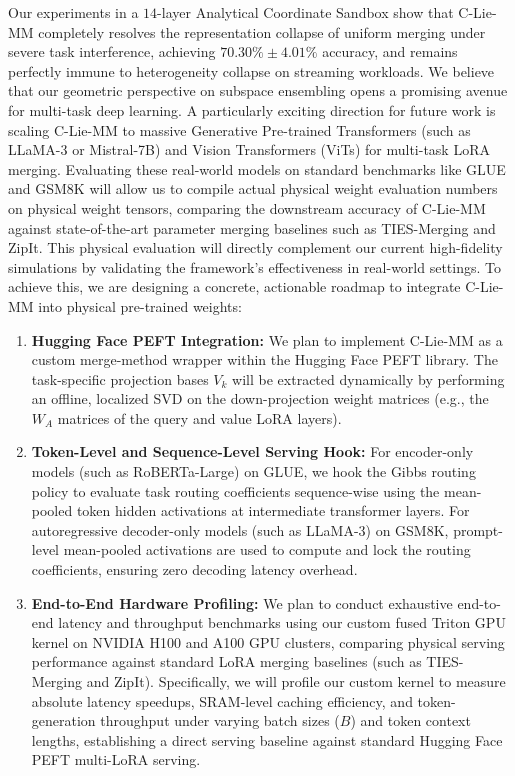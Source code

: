 Our experiments in a $14$-layer Analytical Coordinate Sandbox show that C-Lie-MM completely resolves the representation collapse of uniform merging under severe task interference, achieving $70.30\% \pm 4.01\%$ accuracy, and remains perfectly immune to heterogeneity collapse on streaming workloads. We believe that our geometric perspective on subspace ensembling opens a promising avenue for multi-task deep learning. A particularly exciting direction for future work is scaling C-Lie-MM to massive Generative Pre-trained Transformers (such as LLaMA-3 or Mistral-7B) and Vision Transformers (ViTs) for multi-task LoRA merging. Evaluating these real-world models on standard benchmarks like GLUE and GSM8K will allow us to compile actual physical weight evaluation numbers on physical weight tensors, comparing the downstream accuracy of C-Lie-MM against state-of-the-art parameter merging baselines such as TIES-Merging and ZipIt. This physical evaluation will directly complement our current high-fidelity simulations by validating the framework's effectiveness in real-world settings. To achieve this, we are designing a concrete, actionable roadmap to integrate C-Lie-MM into physical pre-trained weights:
\begin{enumerate}
    \item \textbf{Hugging Face PEFT Integration:} We plan to implement C-Lie-MM as a custom merge-method wrapper within the Hugging Face PEFT library. The task-specific projection bases $V_k$ will be extracted dynamically by performing an offline, localized SVD on the down-projection weight matrices (e.g., the $W_A$ matrices of the query and value LoRA layers).
    \item \textbf{Token-Level and Sequence-Level Serving Hook:} For encoder-only models (such as RoBERTa-Large) on GLUE, we hook the Gibbs routing policy to evaluate task routing coefficients sequence-wise using the mean-pooled token hidden activations at intermediate transformer layers. For autoregressive decoder-only models (such as LLaMA-3) on GSM8K, prompt-level mean-pooled activations are used to compute and lock the routing coefficients, ensuring zero decoding latency overhead.
    \item \textbf{End-to-End Hardware Profiling:} We plan to conduct exhaustive end-to-end latency and throughput benchmarks using our custom fused Triton GPU kernel on NVIDIA H100 and A100 GPU clusters, comparing physical serving performance against standard LoRA merging baselines (such as TIES-Merging and ZipIt). Specifically, we will profile our custom kernel to measure absolute latency speedups, SRAM-level caching efficiency, and token-generation throughput under varying batch sizes ($B$) and token context lengths, establishing a direct serving baseline against standard Hugging Face PEFT multi-LoRA serving.
\end{enumerate}
